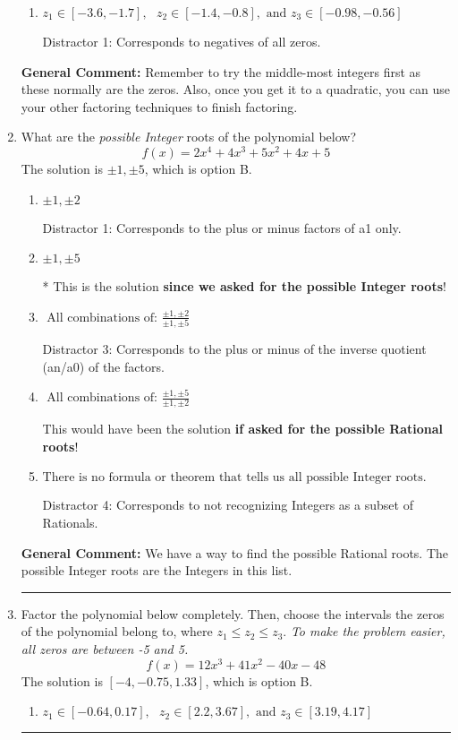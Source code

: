 \documentclass{extbook}[14pt]
\newcommand{\litem}[1]{\item #1

\rule{\textwidth}{0.4pt}}
\begin{document}
\begin{enumerate}
{\begin{enumerate}[label=\Alph*.]
 Distractor 3: Corresponds to negatives of all zeros AND inversing rational roots.
\item \( z_1 \in [-3.6, -1.7], \text{   }  z_2 \in [-1.4, -0.8], \text{   and   } z_3 \in [-0.98, -0.56] \)

 Distractor 1: Corresponds to negatives of all zeros.
\end{enumerate}

\textbf{General Comment:} Remember to try the middle-most integers first as these normally are the zeros. Also, once you get it to a quadratic, you can use your other factoring techniques to finish factoring.
}
\litem{
What are the \textit{possible Integer} roots of the polynomial below?
\[ f(x) = 2x^{4} +4 x^{3} +5 x^{2} +4 x + 5 \]The solution is \( \pm 1,\pm 5 \), which is option B.\begin{enumerate}[label=\Alph*.]
\item \( \pm 1,\pm 2 \)

 Distractor 1: Corresponds to the plus or minus factors of a1 only.
\item \( \pm 1,\pm 5 \)

* This is the solution \textbf{since we asked for the possible Integer roots}!
\item \( \text{ All combinations of: }\frac{\pm 1,\pm 2}{\pm 1,\pm 5} \)

 Distractor 3: Corresponds to the plus or minus of the inverse quotient (an/a0) of the factors. 
\item \( \text{ All combinations of: }\frac{\pm 1,\pm 5}{\pm 1,\pm 2} \)

This would have been the solution \textbf{if asked for the possible Rational roots}!
\item \( \text{There is no formula or theorem that tells us all possible Integer roots.} \)

 Distractor 4: Corresponds to not recognizing Integers as a subset of Rationals.
\end{enumerate}

\textbf{General Comment:} We have a way to find the possible Rational roots. The possible Integer roots are the Integers in this list.
}
\litem{
Factor the polynomial below completely. Then, choose the intervals the zeros of the polynomial belong to, where $z_1 \leq z_2 \leq z_3$. \textit{To make the problem easier, all zeros are between -5 and 5.}
\[ f(x) = 12x^{3} +41 x^{2} -40 x -48 \]The solution is \( [-4, -0.75, 1.33] \), which is option B.\begin{enumerate}[label=\Alph*.]
\item \( z_1 \in [-0.64, 0.17], \text{   }  z_2 \in [2.2, 3.67], \text{   and   } z_3 \in [3.19, 4.17] \)


\end{enumerate}}
\end{enumerate}
\end{document}
